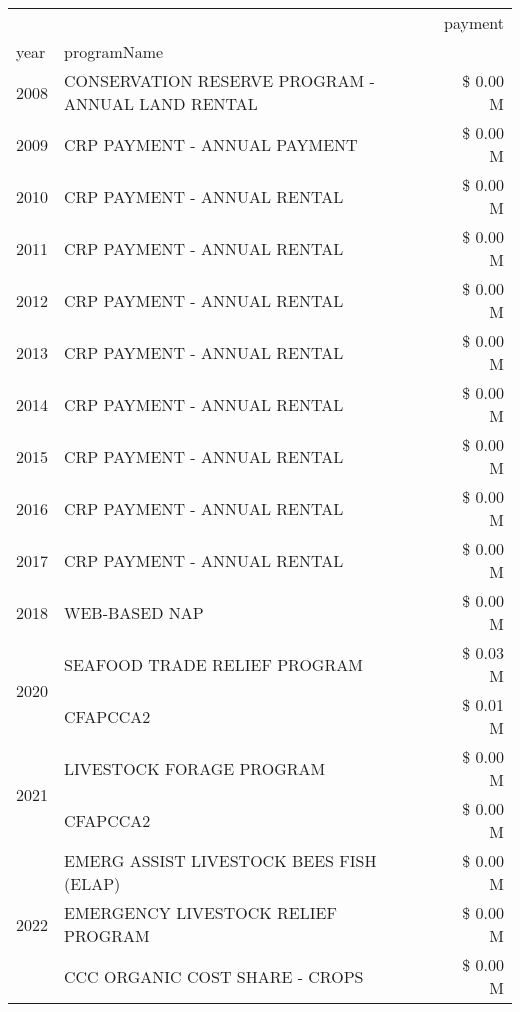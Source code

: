\begin{tabular}{llr}
\toprule
 &  & payment \\
year & programName &  \\
\midrule
2008 & CONSERVATION RESERVE PROGRAM - ANNUAL LAND RENTAL & \$ 0.00 M \\
\cline{1-3}
2009 & CRP PAYMENT - ANNUAL PAYMENT & \$ 0.00 M \\
\cline{1-3}
2010 & CRP PAYMENT - ANNUAL RENTAL & \$ 0.00 M \\
\cline{1-3}
2011 & CRP PAYMENT - ANNUAL RENTAL & \$ 0.00 M \\
\cline{1-3}
2012 & CRP PAYMENT - ANNUAL RENTAL & \$ 0.00 M \\
\cline{1-3}
2013 & CRP PAYMENT - ANNUAL RENTAL & \$ 0.00 M \\
\cline{1-3}
2014 & CRP PAYMENT - ANNUAL RENTAL & \$ 0.00 M \\
\cline{1-3}
2015 & CRP PAYMENT - ANNUAL RENTAL & \$ 0.00 M \\
\cline{1-3}
2016 & CRP PAYMENT - ANNUAL RENTAL & \$ 0.00 M \\
\cline{1-3}
2017 & CRP PAYMENT - ANNUAL RENTAL & \$ 0.00 M \\
\cline{1-3}
2018 & WEB-BASED NAP & \$ 0.00 M \\
\cline{1-3}
\multirow[t]{2}{*}{2020} & SEAFOOD TRADE RELIEF PROGRAM & \$ 0.03 M \\
 & CFAPCCA2 & \$ 0.01 M \\
\cline{1-3}
\multirow[t]{2}{*}{2021} & LIVESTOCK FORAGE PROGRAM & \$ 0.00 M \\
 & CFAPCCA2 & \$ 0.00 M \\
\cline{1-3}
\multirow[t]{3}{*}{2022} & EMERG ASSIST LIVESTOCK BEES FISH (ELAP) & \$ 0.00 M \\
 & EMERGENCY LIVESTOCK RELIEF PROGRAM & \$ 0.00 M \\
 & CCC ORGANIC COST SHARE - CROPS & \$ 0.00 M \\
\cline{1-3}
\bottomrule
\end{tabular}
